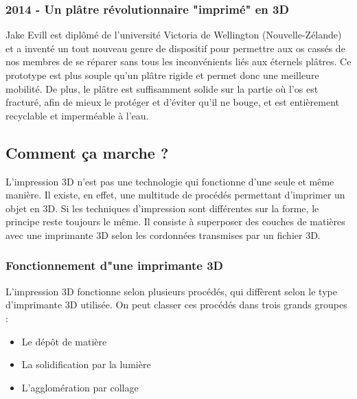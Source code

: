 \documentclass{article}
\begin{document}
\subsubsection{2014 - Un plâtre révolutionnaire "imprimé" en 3D}
Jake Evill est diplômé de l'université Victoria de Wellington (Nouvelle-Zélande) et a inventé un tout nouveau genre de dispositif pour permettre aux os cassés de nos membres de se réparer sans tous les inconvénients liés aux éternels plâtres. Ce prototype est plus souple qu'un plâtre rigide et permet donc une meilleure mobilité. De plus, le plâtre est suffisamment solide sur la partie où l'os est fracturé, afin de mieux le protéger et d'éviter qu'il ne bouge, et est entièrement recyclable et imperméable à l'eau. 
\newpage
\subsection{Comment ça marche ?}
L'impression 3D n'est pas une technologie qui fonctionne d'une seule et même manière. Il existe, en effet, une multitude de procédés permettant d'imprimer un objet en 3D. Si les techniques d'impression sont différentes sur la forme, le principe reste toujours le même. Il consiste à superposer des couches de matières avec une imprimante 3D selon les cordonnées transmises par un fichier 3D.
\subsubsection{Fonctionnement d"une imprimante 3D}
L'impression 3D fonctionne selon plusieurs procédés, qui diffèrent selon le type d'imprimante 3D utilisée. On peut classer ces procédés dans trois grands groupes :
\begin{itemize}
\item Le dépôt de matière
\item La solidification par la lumière
\item L'agglomération par collage
\end{itemize} \hfill
\end{document}
